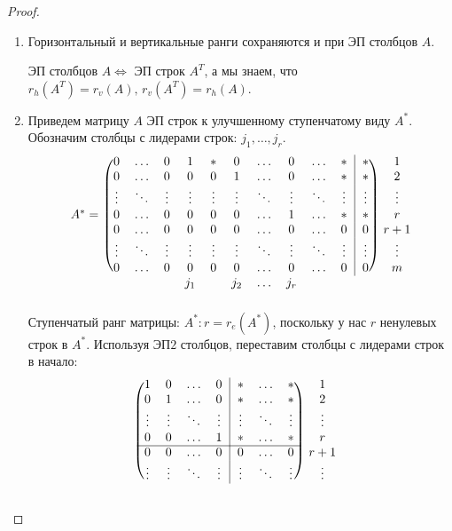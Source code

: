 \documentclass[12pt]{article}
\theoremstyle{definition}
\begin{document}
\begin{proof}
\begin{enumerate}[label=\arabic*)]
		\item Горизонтальный и вертикальные ранги сохраняются и при ЭП столбцов $A$.
		
		ЭП столбцов $A \Leftrightarrow $ ЭП строк $A^T$, а мы знаем, что $r_{h}(A^T) = r_v(A), \, r_v\left(A^T\right) = r_h(A)$. 
		
		\item Приведем матрицу $A$ ЭП строк к улучшенному ступенчатому виду $A^*$. Обозначим столбцы с лидерами строк: $j_1, \dotsc, j_r$.
		$$
			\begin{blockarray}{ccccccccccccc}
				\begin{block}{c(cccccccccc|c)c}			
					& 0 & \dotsc & 0 & 1 & * & 0 & \dotsc & 0 & \dotsc & * &* & 1\\ 
					& 0 & \dotsc & 0 & 0 & 0 & 1 & \dotsc & 0 &\dotsc & * & * & 2\\  
					& \vdots & \ddots & \vdots & \vdots & \vdots & \vdots & \ddots & \vdots & \ddots & \vdots &\vdots & \vdots\\ 
					A^{*} =  & 0 & \dotsc & 0 & 0 & 0 & 0 & \dotsc &  1 & \dotsc & * & * & r\\ 
					&0 & \dotsc & 0 & 0 & 0 & 0 &\dotsc &  0 & \dotsc & 0 & 0 & r+1 \\  
					&\vdots & \ddots & \vdots & \vdots & \vdots & \vdots &\ddots & \vdots & \ddots & \vdots & \vdots & \vdots\\  
					&0 & \dotsc & 0 & 0 & 0 & 0 &\dotsc &  0 & \dotsc & 0 & 0 & m\\
				\end{block}
			& &  &  & j_1 &  & j_2 &\dotsc &  j_r &  &  & & 
		\end{blockarray}
		$$
		Ступенчатый ранг матрицы: $A^* \colon r = r_e{(A^*)}$, поскольку у нас $r$ ненулевых строк в $A^*$. Используя ЭП$2$ столбцов, переставим столбцы с лидерами строк в начало:
		$$
			\begin{blockarray}{cccccccc}
				\begin{block}{(cccc|ccc)c}
					1 & 0 & \dotsc & 0 & * & \dotsc & * & 1\\
					0 & 1 & \dotsc & 0 & * & \dotsc & * & 2\\
					\vdots & \vdots & \ddots & \vdots & \vdots & \ddots & \vdots & \vdots\\
					0 & 0 & \dotsc & 1 & * & \dotsc & * & r\\ \cline{1-7}
					0 & 0 & \dotsc & 0 & 0 & \dotsc & 0 & r+ 1\\
					\vdots & \vdots & \ddots & \vdots & \vdots & \ddots & \vdots & \vdots\\

\end{block}
\end{blockarray}$$
\end{enumerate}
\end{proof}
\end{document}
